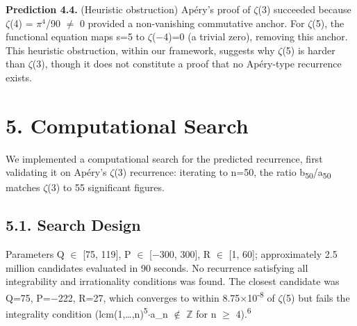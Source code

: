 \documentclass[11pt]{article}
\begin{document}
\textbf{Prediction 4.4.} (Heuristic obstruction) Apéry's proof of
\(\zeta\)(3) succeeded because \(\zeta\)(4) = \(\pi^{4}\)/90 \(\neq\) 0
provided a non-vanishing commutative anchor. For \(\zeta\)(5), the
functional equation maps s=5 to \(\zeta\)(−4)=0 (a trivial zero),
removing this anchor. This heuristic obstruction, within our framework,
suggests why \(\zeta\)(5) is harder than \(\zeta\)(3), though it does
not constitute a proof that no Apéry-type recurrence exists.

\hypertarget{computational-search}{%
\section{5. Computational Search}\label{computational-search}}

We implemented a computational search for the predicted recurrence,
first validating it on Apéry's \(\zeta\)(3) recurrence: iterating to
n=50, the ratio b\textsubscript{50}/a\textsubscript{50} matches
\(\zeta\)(3) to 55 significant figures.

\hypertarget{search-design}{%
\subsection{5.1. Search Design}\label{search-design}}

Parameters Q \(\in\) {[}75, 119{]}, P \(\in\) {[}−300, 300{]}, R \(\in\)
{[}1, 60{]}; approximately 2.5 million candidates evaluated in 90
seconds. No recurrence satisfying all integrability and irrationality
conditions was found. The closest candidate was Q=75, P=−222, R=27,
which converges to within 8.75\(\times\)10\textsuperscript{-8} of
\(\zeta\)(5) but fails the integrality condition
(lcm(1,\ldots,n)\textsuperscript{5}\(\cdot\)a\_n \(\notin\)
\(\mathbb{Z}\) for n \(\geq\) 4).\textsuperscript{6}
\end{document}
